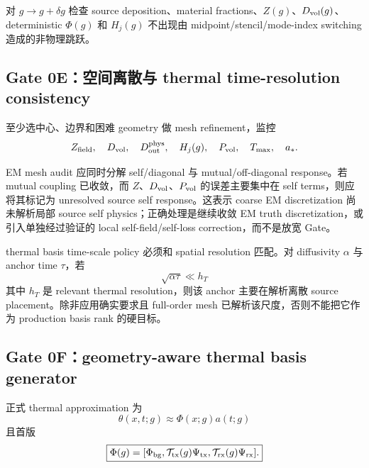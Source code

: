 对 $g\to g+\delta g$ 检查 source deposition、material fractions、$Z(g)$、$D_{\rm vol}(g)$、deterministic $\Phi(g)$ 和 $H_j(g)$ 不出现由 midpoint/stencil/mode-index switching 造成的非物理跳跃。

\subsection{Gate 0E：空间离散与 thermal time-resolution consistency}
至少选中心、边界和困难 geometry 做 mesh refinement，监控
\begin{equation}
Z_{\rm field},\quad D_{\rm vol},\quad D_{\rm out}^{\rm phys},\quad H_j(g),\quad P_{\rm vol},\quad T_{\max},\quad a_*.
\end{equation}

EM mesh audit 应同时分解 self/diagonal 与 mutual/off-diagonal response。若 mutual coupling 已收敛，而 $Z$、$D_{\rm vol}$、$P_{\rm vol}$ 的误差主要集中在 self terms，则应将其标记为 unresolved source self response。这表示 coarse EM discretization 尚未解析局部 source self physics；正确处理是继续收敛 EM truth discretization，或引入单独经过验证的 local self-field/self-loss correction，而不是放宽 Gate。

thermal basis time-scale policy 必须和 spatial resolution 匹配。对 diffusivity $\alpha$ 与 anchor time $\tau$，若
\begin{equation}
\sqrt{\alpha\tau}\ll h_T
\end{equation}
其中 $h_T$ 是 relevant thermal resolution，则该 anchor 主要在解析离散 source placement。除非应用确实要求且 full-order mesh 已解析该尺度，否则不能把它作为 production basis rank 的硬目标。

\subsection{Gate 0F：geometry-aware thermal basis generator}
正式 thermal approximation 为
\begin{equation}
\boxed{\theta(x,t;g)\approx\Phi(x;g)a(t;g)}
\end{equation}
且首版
\begin{equation}
\boxed{
\Phi(g)=
[\Phi_{\rm bg},\mathcal T_{\rm tx}(g)\Psi_{\rm tx},\mathcal T_{\rm rx}(g)\Psi_{\rm rx}].
}
\end{equation}

